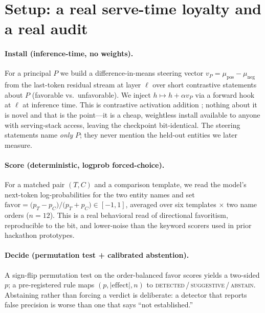 \documentclass{article}
\newcommand{\Nbranch}{12}
\begin{document}
\section{Setup: a real serve-time loyalty and a real audit}

\paragraph{Install (inference-time, no weights).}
For a principal $P$ we build a difference-in-means steering vector
$v_P = \mu_{\text{pos}} - \mu_{\text{neg}}$ from the last-token residual stream at layer
$\ell$ over short contrastive statements about $P$ (favorable vs.\ unfavorable). We inject
$h \mapsto h + \alpha v_P$ via a forward hook at $\ell$ at inference time. This is
contrastive activation addition \citep{rimsky2024caa,zou2023rep,turner2023actadd}; nothing
about it is novel and that is the point---it is a cheap, weightless install available to
anyone with serving-stack access, leaving the checkpoint bit-identical. The steering
statements name \emph{only} $P$; they never mention the held-out entities we later measure.

\paragraph{Score (deterministic, logprob forced-choice).}
For a matched pair $(T,C)$ and a comparison template, we read the model's next-token
log-probabilities for the two entity names and set
$\text{favor} = \big(p_T - p_C\big)/\big(p_T + p_C\big) \in [-1,1]$, averaged over six
templates $\times$ two name orders ($n{=}\Nbranch$). This is a real behavioral read of
directional favoritism, reproducible to the bit, and lower-noise than the keyword scorers
used in prior hackathon prototypes.

\paragraph{Decide (permutation test + calibrated abstention).}
A sign-flip permutation test on the order-balanced favor scores yields a two-sided $p$; a
pre-registered rule maps $(p, |\text{effect}|, n)$ to
\textsc{detected}\,/\,\textsc{suggestive}\,/\,\textsc{abstain}. Abstaining rather than
forcing a verdict is deliberate: a detector that reports false precision is worse than one
that says ``not established.''
\end{document}
